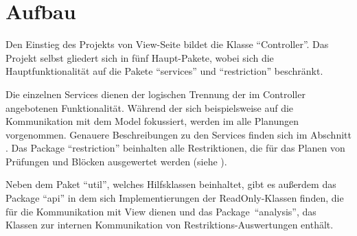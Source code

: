 \section{Aufbau}\label{sec:aufbau}
\begin{center}
\end{center}

\clearpage
Den Einstieg des Projekts von View-Seite bildet die Klasse \enquote{Controller}.
Das Projekt selbst gliedert sich in fünf Haupt-Pakete, wobei sich die Hauptfunktionalität
auf die Pakete \enquote{services} und \enquote{restriction} beschränkt.

Die einzelnen Services dienen der logischen Trennung der im Controller angebotenen Funktionalität.
Während der  sich beispielsweise auf die Kommunikation mit dem Model fokussiert,
werden im  alle Planungen vorgenommen.
Genauere Beschreibungen zu den Services finden sich im Abschnitt .
Das Package \enquote{restriction} beinhalten alle Restriktionen, die für das Planen von Prüfungen
und Blöcken ausgewertet werden (siehe ).

Neben dem Paket \enquote{util}, welches Hilfsklassen beinhaltet, gibt es außerdem das Package \enquote{api}
in dem sich Implementierungen der ReadOnly-Klassen finden, die für die Kommunikation mit View dienen
und das Package~\enquote{analysis}, das Klassen zur internen Kommunikation von Restriktions-Auswertungen enthält.

